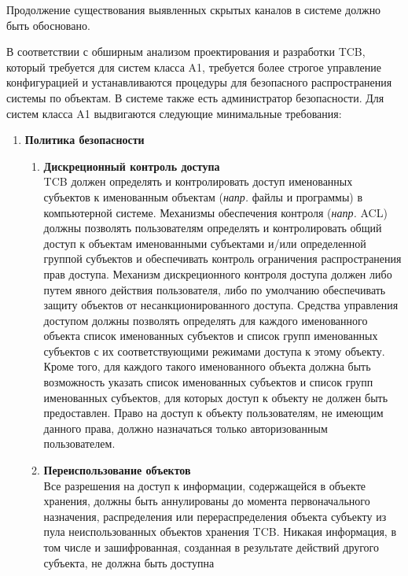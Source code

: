 \begin{enumerate}
\begin{enumerate}
\begin{itemize}
			Продолжение существования выявленных скрытых каналов в системе должно быть обосновано.
		\end{itemize}
		В соответствии с обширным анализом проектирования и разработки TCB, который требуется для систем класса A1, требуется более строгое управление конфигурацией и устанавливаются
		процедуры для безопасного распространения системы по объектам. В системе также есть администратор безопасности. Для систем класса A1 выдвигаются следующие минимальные требования:
		\begin{enumerate}
            \item{\textbf{Политика безопасности}}
            \begin{enumerate}
                \item{\textbf{Дискреционный контроль доступа}}\\
                TCB должен определять и контролировать доступ именованных субъектов к именованным объектам (\textit{напр.} файлы и программы) в компьютерной системе. Механизмы обеспечения контроля
                (\textit{напр.} ACL) должны позволять пользователям определять и контролировать общий доступ к объектам именованными субъектами и/или определенной группой субъектов и обеспечивать
                контроль ограничения распространения прав доступа. Механизм дискреционного контроля доступа должен либо путем явного действия пользователя, либо по умолчанию обеспечивать защиту
                объектов от несанкционированного доступа. Средства управления доступом должны позволять определять для каждого именованного объекта список именованных субъектов и список групп
                именованных субъектов с их соответствующими режимами доступа к этому объекту. Кроме того, для каждого такого именованного объекта должна быть возможность указать список
                именованных субъектов и список групп именованных субъектов, для которых доступ к объекту не должен быть предоставлен. Право на доступ к объекту пользователям, не имеющим
                данного права, должно назначаться только авторизованным пользователем.
                \item{\textbf{Переиспользование объектов}}\\
                Все разрешения на доступ к информации, содержащейся в объекте хранения, должны быть аннулированы до момента первоначального назначения, распределения или перераспределения объекта
                субъекту из пула неиспользованных объектов хранения TCB. Никакая информация, в том числе и зашифрованная, созданная в результате действий другого субъекта, не должна быть доступна

\end{enumerate}
\end{enumerate}
\end{enumerate}
\end{enumerate}
